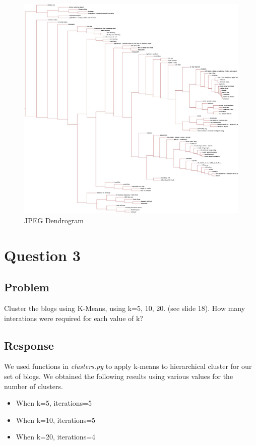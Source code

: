 \documentclass[letterpaper,11pt]{report}
\begin{document}
\begin{savenotes}
\begin{figure}
	\centering
		\includegraphics[width=1.00\textwidth]{blogclust.jpg}
	\caption{JPEG Dendrogram}
	\label{fig:blogclust}
\end{figure}

\section{Question 3}
\subsection{Problem}Cluster the blogs using K-Means, using k=5, 10, 20. (see slide 18). How many interations were required for each value of k?
\subsection{Response}We used functions in \emph{clusters.py} to apply k-means to hierarchical cluster for our set of blogs. We obtained the following results using various values for the number of clusters.

\begin{itemize}
\item When k=5, iterations=5
\item When k=10, iterations=5
\item When k=20, iterations=4
\end{itemize}


\end{savenotes}
\end{document}
